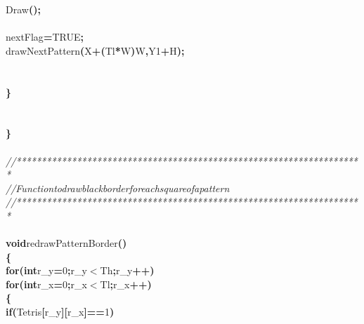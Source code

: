 \documentclass[a4paper, 10pt]{article}
\newcommand\SPC{\hspace*{0.6em}}
\newcommand\HYP{\mbox{\char 45}}
\newcommand{\CppAComment}[1]{\textit{\textcolor[rgb]{0.2,0.6,1}{#1}}}
\newcommand{\CppAIdentifier}[1]{#1}
\newcommand{\CppANumber}[1]{\textcolor[rgb]{0.5,0,0.5}{#1}}
\newcommand{\CppAReservedWord}[1]{\textbf{#1}}
\newcommand{\CppASpace}[1]{\colorbox[rgb]{1,1,1}{#1}}
\newcommand{\CppASymbol}[1]{\textbf{\textcolor[rgb]{1,0,0}{#1}}}
\begin{document}
\begin{ttfamily}
\CppASpace{\SPC \SPC }\CppAIdentifier{Draw}\CppASymbol{(}\CppASymbol{)}\CppASymbol{;}\\
\\
\CppASpace{\SPC \SPC }\CppAIdentifier{nextFlag}\CppASymbol{=}\CppAIdentifier{TRUE}\CppASymbol{;}\\
\CppASpace{\SPC \SPC }\CppAIdentifier{drawNextPattern}\CppASymbol{(}\CppAIdentifier{X}\CppASymbol{+}\CppASymbol{(}\CppAIdentifier{Tl}\CppASymbol{*}\CppAIdentifier{W}\CppASymbol{)}\CppASymbol{\HYP }\CppAIdentifier{W}\CppASymbol{,}\CppAIdentifier{Y}\CppASymbol{\HYP }\CppANumber{1}\CppASymbol{+}\CppAIdentifier{H}\CppASymbol{)}\CppASymbol{;}\\
\\
\\
\CppASpace{\SPC }\CppASymbol{\}}\\
\\
\\
\CppASymbol{\}}\\
\\
\CppAComment{//*********************************************************************}\\
\CppAComment{//\SPC \SPC \SPC Function\SPC to\SPC draw\SPC black\SPC border\SPC for\SPC each\SPC square\SPC of\SPC a\SPC pattern}\\
\CppAComment{//*********************************************************************}\\
\\
\CppAReservedWord{void}\CppASpace{\SPC }\CppAIdentifier{redrawPatternBorder}\CppASymbol{(}\CppASymbol{)}\\
\CppASymbol{\{}\\
\CppASpace{\SPC }\CppAReservedWord{for}\CppASymbol{(}\CppAReservedWord{int}\CppASpace{\SPC }\CppAIdentifier{r\_y}\CppASymbol{=}\CppANumber{0}\CppASymbol{;}\CppAIdentifier{r\_y}\CppASymbol{$<$}\CppAIdentifier{Th}\CppASymbol{;}\CppAIdentifier{r\_y}\CppASymbol{++}\CppASymbol{)}\\
\CppASpace{\SPC \SPC }\CppAReservedWord{for}\CppASymbol{(}\CppAReservedWord{int}\CppASpace{\SPC }\CppAIdentifier{r\_x}\CppASymbol{=}\CppANumber{0}\CppASymbol{;}\CppAIdentifier{r\_x}\CppASymbol{$<$}\CppAIdentifier{Tl}\CppASymbol{;}\CppAIdentifier{r\_x}\CppASymbol{++}\CppASymbol{)}\\
\CppASpace{\SPC \SPC }\CppASymbol{\{}\\
\CppASpace{\SPC \SPC \SPC }\CppAReservedWord{if}\CppASymbol{(}\CppAIdentifier{Tetris}\CppASymbol{[}\CppAIdentifier{r\_y}\CppASymbol{]}\CppASymbol{[}\CppAIdentifier{r\_x}\CppASymbol{]}\CppASymbol{==}\CppANumber{1}\CppASymbol{)}\\

\end{ttfamily}
\end{document}
